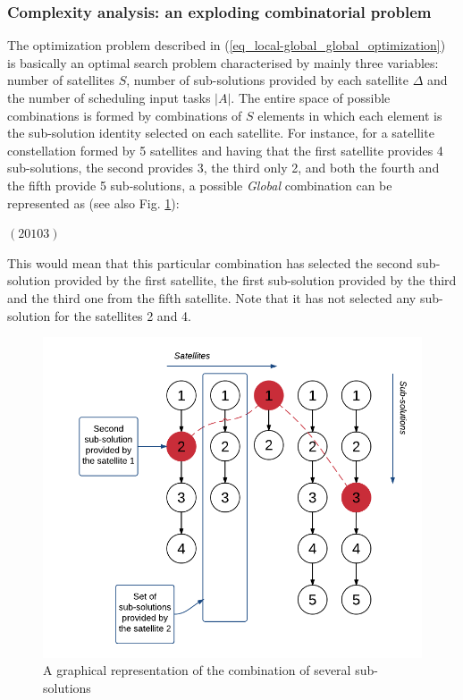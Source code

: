 \subsubsection{Complexity analysis: an exploding combinatorial problem}

The optimization problem described in (\ref{eq_local-global_global_optimization}) is basically an optimal search problem characterised by mainly three variables: number of satellites $S$, number of sub-solutions provided by each satellite $\Delta$ and the number of scheduling input tasks $|A|$. The entire space of possible combinations is formed by combinations of $S$ elements in which each element is the sub-solution identity selected on each satellite. For instance, for a satellite constellation formed by 5 satellites and having that the first satellite provides 4 sub-solutions, the second provides 3, the third only 2, and both the fourth and the fifth provide 5 sub-solutions, a possible \emph{Global} combination can be represented as (see also Fig. \ref{fig_comb_repr}):

\begin{center}
$ \left(2 0 1 0 3\right) $
\end{center}

This would mean that this particular combination has selected the second sub-solution provided by the first satellite, the first sub-solution provided by the third and the third one from the fifth satellite. Note that it has not selected any sub-solution for the satellites 2 and 4.

\begin{figure}[h!]
\centering
\includegraphics[scale=0.5]{Figures/comb_repr.png} 
\caption{A graphical representation of the combination of several sub-solutions}
\label{fig_comb_repr}
\end{figure}

